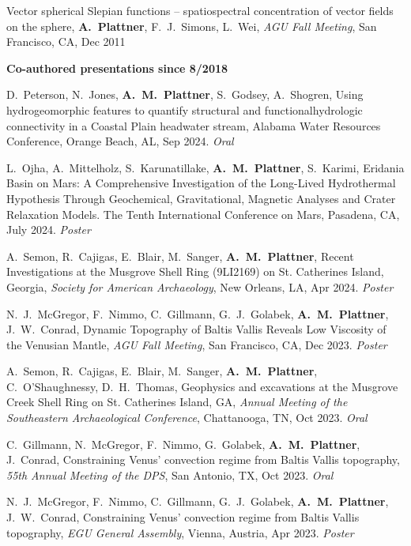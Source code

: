 \documentclass[10pt]{article}
\begin{document}
\spcp
Vector spherical Slepian functions -- spatiospectral concentration of vector fields on the sphere,
\textbf{A.~Plattner}, F.~J.~Simons, L.~Wei,
\emph{AGU Fall Meeting}, San Francisco, CA, Dec 2011


\spc
\textbf{\tsize Co-authored presentations since 8/2018}


\spcp D.\ Peterson, N.\ Jones, \textbf{A.\ M.\ Plattner}, S.\ Godsey, A.\ Shogren, Using hydrogeomorphic features to quantify structural and functionalhydrologic connectivity in a Coastal Plain headwater stream, Alabama Water Resources Conference, Orange Beach, AL, Sep 2024. \emph{Oral}

\spcp
L.\ Ojha, A.\ Mittelholz, S.\ Karunatillake, \textbf{A.\ M.\ Plattner}, S.\ Karimi, Eridania Basin on Mars: A Comprehensive Investigation of the Long-Lived Hydrothermal Hypothesis Through Geochemical, Gravitational, Magnetic Analyses and Crater Relaxation Models. The Tenth International Conference on Mars, Pasadena, CA, July 2024. \emph{Poster}

\spcp A.\ Semon, R.\ Cajigas, E.\ Blair, M.\ Sanger, \textbf{A.\ M.\ Plattner}, Recent Investigations at the Musgrove Shell Ring (9LI2169) on St. Catherines Island, Georgia, \emph{Society for American Archaeology}, New Orleans, LA, Apr 2024. \emph{Poster}

\spcp N.~J.~McGregor, F.~Nimmo, C.~Gillmann, G.~J.~Golabek, \textbf{A.~M.~Plattner}, J.~W.~Conrad, Dynamic Topography of Baltis Vallis Reveals Low Viscosity of the Venusian Mantle, \emph{AGU Fall Meeting}, San Francisco, CA, Dec 2023. \emph{Poster}

\spcp
A.~Semon, R.~Cajigas, E.~Blair, M.~Sanger, \textbf{A.~M.~Plattner}, C.~O'Shaughnessy, D.~H.~Thomas, Geophysics and excavations at the Musgrove Creek Shell Ring on St. Catherines Island, GA, \emph{Annual Meeting of the Southeastern Archaeological Conference}, Chattanooga, TN, Oct 2023. \emph{Oral}

\spcp C.~Gillmann, N.~McGregor, F.~Nimmo, G.~Golabek, \textbf{A.~M.~Plattner}, J.~Conrad, Constraining Venus' convection regime from Baltis Vallis topography, \emph{55th Annual Meeting of the DPS}, San Antonio, TX, Oct 2023. \emph{Oral}

\spcp N.~J.~McGregor, F.~Nimmo, C.~Gillmann, G.~J.~Golabek, \textbf{A.~M.~Plattner}, J.~W.~Conrad, Constraining Venus' convection regime from Baltis Vallis topography, \emph{EGU General Assembly}, Vienna, Austria, Apr 2023. \emph{Poster}
\end{document}
